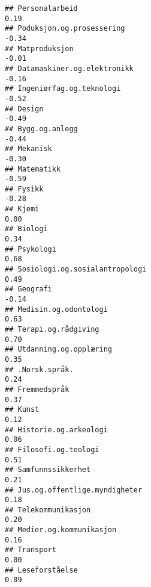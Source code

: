 \documentclass[
]{article}
\begin{document}
\begin{verbatim}
## Personalarbeid                                                                    0.19
## Poduksjon.og.prosessering                                                        -0.34
## Matproduksjon                                                                    -0.01
## Datamaskiner.og.elektronikk                                                      -0.16
## Ingeniørfag.og.teknologi                                                         -0.52
## Design                                                                           -0.49
## Bygg.og.anlegg                                                                   -0.44
## Mekanisk                                                                         -0.30
## Matematikk                                                                       -0.59
## Fysikk                                                                           -0.28
## Kjemi                                                                             0.00
## Biologi                                                                           0.34
## Psykologi                                                                         0.68
## Sosiologi.og.sosialantropologi                                                    0.49
## Geografi                                                                         -0.14
## Medisin.og.odontologi                                                             0.63
## Terapi.og.rådgiving                                                               0.70
## Utdanning.og.opplæring                                                            0.35
## .Norsk.språk.                                                                     0.24
## Fremmedspråk                                                                      0.37
## Kunst                                                                             0.12
## Historie.og.arkeologi                                                             0.06
## Filosofi.og.teologi                                                               0.51
## Samfunnssikkerhet                                                                 0.21
## Jus.og.offentlige.myndigheter                                                     0.18
## Telekommunikasjon                                                                 0.20
## Medier.og.kommunikasjon                                                           0.16
## Transport                                                                         0.00
## Leseforståelse                                                                    0.09

\end{verbatim}
\end{document}
